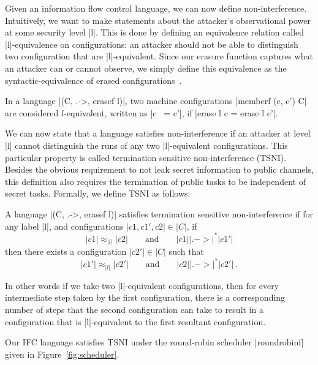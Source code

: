 Given an information flow control language, we can now define non-interference.
Intuitively, we want to make statements about the attacker's observational
power at some security level |l|.  This is done by defining an equivalence
relation called |l|-equivalence on configurations: an attacker should
not be able to distinguish two configuration that are |l|-equivalent.
%
Since our erasure function captures what an attacker can or cannot observe, we simply define this
equivalence as the syntactic-equivalence of erased configurations~\cite{stefan:addressing-covert}.
%
\begin{definition}[|l|-equivalence]
    In a language |(C, .->, erasef l)|, two machine configurations
    |memberf (c, c') C| are considered $l$-equivalent, written as |c ~= c'|,
    if |erase l c = erase l c'|.
\end{definition}
%

We can now state that a language satisfies non-interference if an
attacker at level |l| cannot distinguish the runs of any two |l|-equivalent
configurations.
%
This particular property is called termination sensitive non-interference
(TSNI).  Besides the obvious requirement to not leak secret information
to public channels, this definition also requires the termination
of public tasks to be independent of secret tasks.
%
Formally, we define TSNI as follows:

\begin{definition}
  A language |(C, .->, erasef l)| satisfies termination
  sensitive non-interference if for any label |l|, and configurations
  $|c1, c1', c2|\in|C|$, if
  \begin{equation} \label{eq:tsni-lhs}
    |c1| \approx_{|l|} |c2|
    \qquad \text{and} \qquad
    |c1| |.->|^* |c1'|
  \end{equation}
  then there exists a configuration $|c2'|\in|C|$ such that
  \begin{equation} \label{eq:tsni-rhs}
    |c1'| \approx_{|l|} |c2'|
     \qquad \text{and} \qquad
    |c2| |.->|^* |c2'|
    \ \text{.}
  \end{equation}
\end{definition}
%
In other words if we take two |l|-equivalent configurations, then for every
intermediate step taken by the first configuration, there is a corresponding
number of steps that the second configuration can take to result in a
configuration that is |l|-equivalent to the first resultant configuration.


Our IFC language satisfies TSNI %
%
under the round-robin scheduler
|roundrobinf| given in Figure~\ref{fig:scheduler}.

